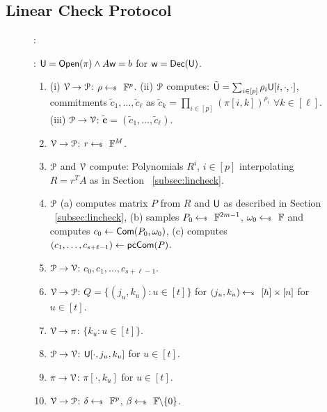 \subsection{Linear Check Protocol}
\vspace{-0.4cm}
\begin{figure}[h!]
	{\footnotesize
		\begin{framed}
			:
			
			: $\ewit=\open(\pi)\wedge A\wit=b$ for $\wit=\dec(\ewit)$.
			
			\begin{enumerate}[{\rm 1.}]
				\item (i) $\verifier\rightarrow\prover$: $\rho\sample \FF^p$. (ii) $\prover$ computes: $\tilde{\ewit}=\sum_{i\in [p]}\rho_i\ewit[i,\cdot,\cdot]$, commitments $\tilde{c}_1,\ldots,\tilde{c}_\ell$ as $\tilde{c}_k = \prod_{i\in[p]}(\pi[i,k])^{\rho_i}$ $\forall k\in[\ell]$. (iii) $\prover\rightarrow\verifier$: $\tilde{\bm{c}}=(\tilde{c}_1,\ldots,\tilde{c}_\ell)$.
				\item $\verifier\rightarrow\prover$: $r\sample \FF^M$.
				\item $\prover$ and $\verifier$ compute: Polynomials $R^i$, $i\in [p]$ interpolating $R=r^TA$ as in Section ~\ref{subsec:lincheck}.
				\item $\prover$ (a) computes matrix $P$ from $R$ and $\ewit$ as described in Section ~\ref{subsec:lincheck}, (b) samples $P_0\sample \FF^{2m-1}$, $\omega_0\sample \FF$ and computes $c_0\gets \comm(P_0,\omega_0)$, (c) computes $(c_1,\ldots,c_{s+\ell-1}) \gets \pccom(P)$.
				\item $\prover\rightarrow\verifier$: $c_0,c_1,\ldots,c_{s+\ell-1}$.
				\item $\verifier\rightarrow\prover$: $Q=\{(j_u,k_u):u\in [t]\}$ for $(j_u,k_u)\sample [h]\times [n]$ for $u\in [t]$.
				\item $\verifier\rightarrow\pi$: $\{k_u:u\in [t]\}$.
				\item $\prover\rightarrow\verifier$: $\ewit[\cdot,j_u,k_u]$ for $u\in [t]$.
				\item $\pi\rightarrow\verifier$: $\pi[\cdot,k_u]$ for $u\in [t]$.
				\item $\verifier\rightarrow\prover$: $\delta\sample \FF^p$, $\beta\sample \FF\backslash \{0\}$.

\end{enumerate}
\end{framed}}
\end{figure}
